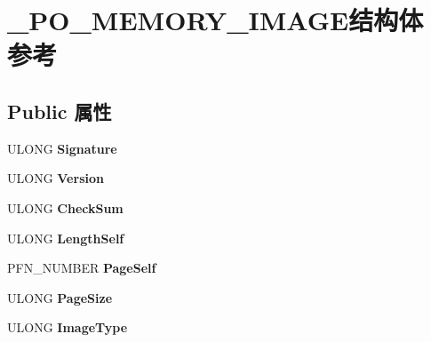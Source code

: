 \hypertarget{struct___p_o___m_e_m_o_r_y___i_m_a_g_e}{}\section{\+\_\+\+P\+O\+\_\+\+M\+E\+M\+O\+R\+Y\+\_\+\+I\+M\+A\+G\+E结构体 参考}
\label{struct___p_o___m_e_m_o_r_y___i_m_a_g_e}
\subsection*{Public 属性}
\begin{DoxyCompactItemize}
\item 
\mbox{\label{struct___p_o___m_e_m_o_r_y___i_m_a_g_e_a6602aed4369c3a77353ed75f688081cf}} 
U\+L\+O\+NG {\bfseries Signature}
\item 
\mbox{\label{struct___p_o___m_e_m_o_r_y___i_m_a_g_e_a2ca1abcf40c454dc2554b63fe1572329}} 
U\+L\+O\+NG {\bfseries Version}
\item 
\mbox{\label{struct___p_o___m_e_m_o_r_y___i_m_a_g_e_aaa85dbdf729a5db9086f316c9c8733e0}} 
U\+L\+O\+NG {\bfseries Check\+Sum}
\item 
\mbox{\label{struct___p_o___m_e_m_o_r_y___i_m_a_g_e_afd62924ebd5b5c65cbcc4b8c9f98d2ca}} 
U\+L\+O\+NG {\bfseries Length\+Self}
\item 
\mbox{\label{struct___p_o___m_e_m_o_r_y___i_m_a_g_e_adaee1364de04c93f0dfc82619873b07e}} 
P\+F\+N\+\_\+\+N\+U\+M\+B\+ER {\bfseries Page\+Self}
\item 
\mbox{\label{struct___p_o___m_e_m_o_r_y___i_m_a_g_e_a55c93046bbb3b39fe38ff782b6d597af}} 
U\+L\+O\+NG {\bfseries Page\+Size}
\item 
\mbox{\label{struct___p_o___m_e_m_o_r_y___i_m_a_g_e_ae94edfba5a6096a1c0d455b96fb68203}} 
U\+L\+O\+NG {\bfseries Image\+Type}
\item 
\mbox{\label{struct___p_o___m_e_m_o_r_y___i_m_a_g_e_a6264e8b4af8a1c69498aefa13180aca9}} 

\end{DoxyCompactItemize}
